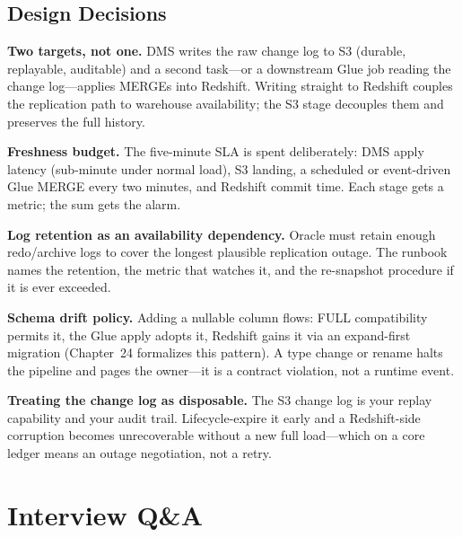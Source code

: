 \subsection{Design Decisions}
\textbf{Two targets, not one.} DMS writes the raw change log to S3 (durable, replayable, auditable) and a second task---or a downstream Glue job reading the change log---applies MERGEs into Redshift. Writing straight to Redshift couples the replication path to warehouse availability; the S3 stage decouples them and preserves the full history.

\textbf{Freshness budget.} The five-minute SLA is spent deliberately: DMS apply latency (sub-minute under normal load), S3 landing, a scheduled or event-driven Glue MERGE every two minutes, and Redshift commit time. Each stage gets a metric; the sum gets the alarm.

\textbf{Log retention as an availability dependency.} Oracle must retain enough redo/archive logs to cover the longest plausible replication outage. The runbook names the retention, the metric that watches it, and the re-snapshot procedure if it is ever exceeded.

\textbf{Schema drift policy.} Adding a nullable column flows: FULL compatibility permits it, the Glue apply adopts it, Redshift gains it via an expand-first migration (Chapter~24 formalizes this pattern). A type change or rename halts the pipeline and pages the owner---it is a contract violation, not a runtime event.

\begin{pitfall}
\textbf{Treating the change log as disposable.} The S3 change log is your replay capability and your audit trail. Lifecycle-expire it early and a Redshift-side corruption becomes unrecoverable without a new full load---which on a core ledger means an outage negotiation, not a retry.
\end{pitfall}

\section{Interview Q\&A}

